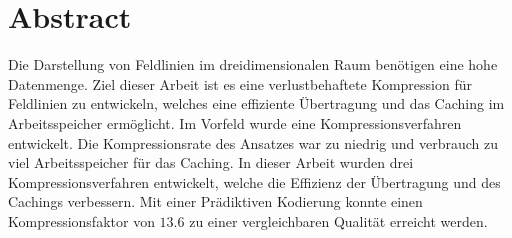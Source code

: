 \section*{Abstract}
Die Darstellung von Feldlinien im dreidimensionalen Raum benötigen eine hohe Datenmenge. Ziel dieser Arbeit ist es eine verlustbehaftete Kompression für Feldlinien zu entwickeln, welches eine effiziente Übertragung und das Caching im Arbeitsspeicher ermöglicht. Im Vorfeld wurde eine Kompressionsverfahren entwickelt. Die Kompressionsrate des Ansatzes war zu niedrig und verbrauch zu viel Arbeitsspeicher für das Caching. In dieser Arbeit wurden drei Kompressionsverfahren entwickelt, welche die Effizienz der Übertragung und des Cachings verbessern. Mit einer Prädiktiven Kodierung konnte einen Kompressionsfaktor von $13.6$ zu einer vergleichbaren Qualität erreicht werden.